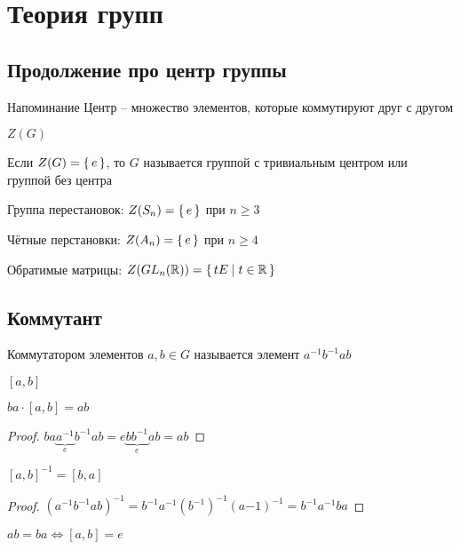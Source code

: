 \chapter{Теория групп}

\section{Продолжение про центр группы}

\begin{undefthm}{Напоминание}
	Центр -- множество элементов, которые коммутируют друг с другом
    \begin{notation}
    	$ Z(G) $
    \end{notation}
\end{undefthm}

\begin{definition}
    Если $ Z(G) = \set{e} $, то $ G $ называется группой с тривиальным центром или группой без центра
\end{definition}

\begin{exmpls}
    \item Группа перестановок: $ Z(S_n) = \set{e} $ при $ n \ge 3 $
    \item Чётные перстановки: $ Z(A_n) = \set{e} $ при $ n \ge 4 $
    \item Обратимые матрицы: $ Z(GL_n(\mathbb{R})) = \set{tE | t \in \ensuremath{\mathbb{R}}} $
\end{exmpls}

\section{Коммутант}

\begin{definition}
    Коммутатором элементов $ a, b \in G $ называется элемент $ a^{-1}b^{-1}ab $
\end{definition}

\begin{notation}
	$ [a, b] $
\end{notation}

\begin{props}
	\item $ ba \cdot [a, b] = ab $
    \begin{proof}
        $ ba\underbrace{a^{-1}}_eb^{-1}ab = e\underbrace{bb^{-1}}_eab = ab $
    \end{proof}
    \item $ [a, b]^{-1} = [b, a] $
    \begin{proof}
        $ (a^{-1}b^{-1}ab)^{-1} = b^{-1}a^{-1}(b^{-1})^{-1}(a{-1})^{-1} = b^{-1}a^{-1}ba $
    \end{proof}
    \item $ ab = ba \iff [a, b] = e $
\end{props}

